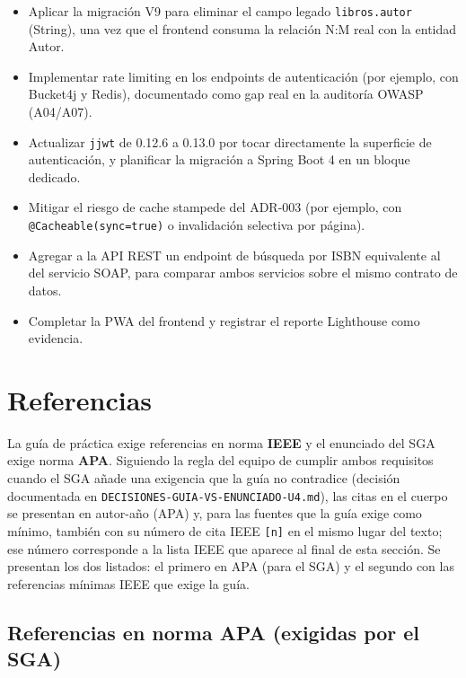\documentclass[12pt,a4paper]{article}
\begin{document}
\begin{itemize}[leftmargin=1.2cm]
  \item Aplicar la migración V9 para eliminar el campo legado \texttt{libros.autor}
        (String), una vez que el frontend consuma la relación N:M real con la entidad
        Autor.
  \item Implementar rate limiting en los endpoints de autenticación (por ejemplo, con
        Bucket4j y Redis), documentado como gap real en la auditoría OWASP (A04/A07).
  \item Actualizar \texttt{jjwt} de 0.12.6 a 0.13.0 por tocar directamente la superficie
        de autenticación, y planificar la migración a Spring Boot 4 en un bloque dedicado.
  \item Mitigar el riesgo de cache stampede del ADR-003 (por ejemplo, con
        \texttt{@Cacheable(sync=true)} o invalidación selectiva por página).
  \item Agregar a la API REST un endpoint de búsqueda por ISBN equivalente al del servicio
        SOAP, para comparar ambos servicios sobre el mismo contrato de datos.
  \item Completar la PWA del frontend y registrar el reporte Lighthouse como evidencia.
\end{itemize}

\newpage

\section{Referencias}

La guía de práctica exige referencias en norma \textbf{IEEE} y el enunciado del SGA exige
norma \textbf{APA}. Siguiendo la regla del equipo de cumplir ambos requisitos cuando el
SGA añade una exigencia que la guía no contradice (decisión documentada en
\texttt{DECISIONES-GUIA-VS-ENUNCIADO-U4.md}), las citas en el cuerpo se presentan en
autor-año (APA) y, para las fuentes que la guía exige como mínimo, también con su número
de cita IEEE \texttt{[n]} en el mismo lugar del texto; ese número corresponde a la lista
IEEE que aparece al final de esta sección. Se presentan los dos listados: el primero en
APA (para el SGA) y el segundo con las referencias mínimas IEEE que exige la guía.

\subsection*{Referencias en norma APA (exigidas por el SGA)}
\end{document}
